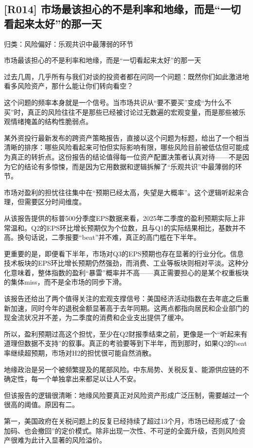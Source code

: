\documentclass[11pt]{ctexart}
\begin{document}
\subsection{[R014] 市场最该担心的不是利率和地缘，而是“一切看起来太好”的那一天}
{\small\color{refgray}归类：风险偏好：乐观共识中最薄弱的环节}

市场最该担心的不是利率和地缘，而是“一切看起来太好”的那一天

过去几周，几乎所有与我们对谈的投资者都在问同一个问题：既然你们如此激进地看多风险资产，那什么能让你们转向看空？

这个问题的频率本身就是一个信号。当市场共识从“要不要买”变成“为什么不买”时，真正的风险往往不是那些已经被讨论过无数遍的宏观变量，而是那些被乐观情绪掩盖的结构性脆弱点。

某外资投行最新发布的跨资产策略报告，直接以这个问题为标题，给出了一个相当清晰的排序：哪些风险看起来可怕但实际影响有限，哪些风险目前被低估但可能成为真正的转折点。这份报告的结论值得每一位资产配置决策者认真对待——不是因为它的结论有多惊悚，而是因为它用数据和逻辑拆解了“乐观共识”中最薄弱的环节。

市场对盈利的担忧往往集中在“预期已经太高，失望是大概率”。这个逻辑听起来合理，但需要区分时间维度。

从该报告提供的标普500分季度EPS数据来看，2025年二季度的盈利预期实际上非常温和。Q2的EPS环比增长预期仅为个位数，且与Q1的实际结果相比，基数并不高。换句话说，二季报要“beat”并不难，真正的高门槛在下半年。

更重要的是，即便看下半年，市场对Q3的EPS预期也存在显著的行业分化。信息技术板块的EPS环比增长预期仍然强劲，而消费、工业等板块则相对平淡。这种分化意味着，整体指数的盈利“暴雷”概率并不高——真正需要担心的是某个权重板块的集体miss，而不是全市场的同步下滑。

该报告还给出了两个值得关注的宏观支撑信号：美国经济活动指数在去年底之后重新加速，同时今年的退税金额显著高于去年同期。这两点都指向居民和企业部门的现金流状况并不差，为二季度的消费和企业支出提供了缓冲。

所以，盈利预期过高这个担忧，至少在Q2财报季结束之前，更像是一个“听起来有道理但数据不支持”的叙事。真正的考验要等到下半年，而到那时，如果Q2的beat率继续超预期，市场对H2的担忧很可能自然消散。

地缘政治是另一个被频繁提及的尾部风险。中东局势、关税反复、能源供应链的不确定性，每一个单独拿出来都足以让人不安。

但该报告的逻辑很清晰：地缘风险要真正对风险资产形成广泛压制，需要越过一个很高的阈值。原因有二。

第一，美国政府在关税问题上的反复已经持续了超过13个月，市场已经形成了“会加码、也会撤回”的定价模式。除非出现一次性、不可逆的全面升级，否则风险资产很难为此计入显著的风险溢价。
\end{document}
